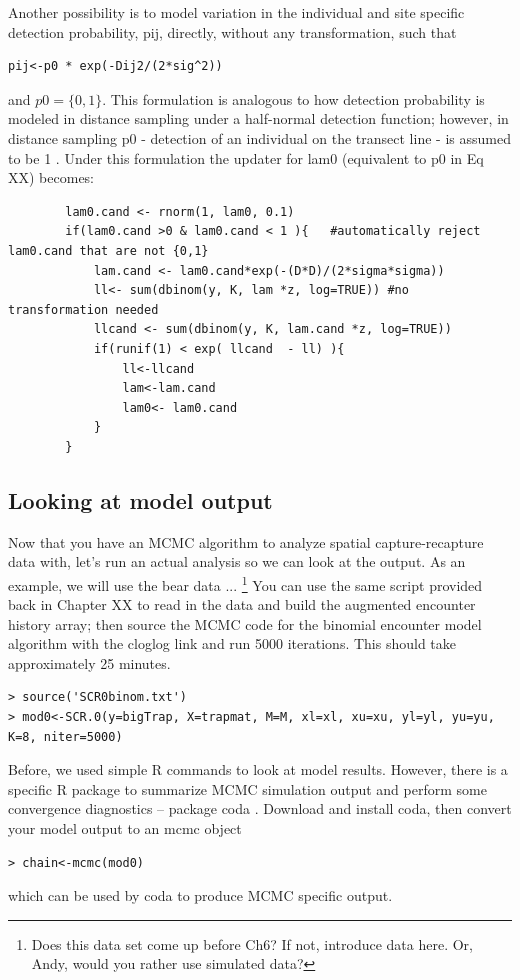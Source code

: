 Another possibility is to model variation in the individual and site specific detection probability, pij, directly, without any transformation, such that
\begin{verbatim}
pij<-p0 * exp(-Dij2/(2*sig^2))
\end{verbatim}
and $p0 = \{0,1\}$. 
This formulation is analogous to how detection probability is modeled in distance sampling under a half-normal detection function; however, in distance sampling p0 - detection of an individual on the transect line - is assumed to be 1 \citep{buckland_etal:2001}. Under this formulation the updater for lam0 (equivalent to p0 in Eq XX) becomes:
\begin{verbatim}
        lam0.cand <- rnorm(1, lam0, 0.1)
        if(lam0.cand >0 & lam0.cand < 1 ){   #automatically reject lam0.cand that are not {0,1}
            lam.cand <- lam0.cand*exp(-(D*D)/(2*sigma*sigma))
            ll<- sum(dbinom(y, K, lam *z, log=TRUE)) #no transformation needed
            llcand <- sum(dbinom(y, K, lam.cand *z, log=TRUE))
            if(runif(1) < exp( llcand  - ll) ){
                ll<-llcand
                lam<-lam.cand
                lam0<- lam0.cand
            }
        } 
\end{verbatim}


\subsection{Looking at model output}
Now that you have an MCMC algorithm to analyze spatial capture-recapture data with, let's run an actual analysis so we can look at the output. As an example, we will use the bear data ... \footnote{Does this data set come up before Ch6? If not, introduce data here. Or, Andy, would you rather use simulated data?} You can use the same script provided back in Chapter XX to read in the data and build the augmented encounter history array; then source the MCMC code for the binomial encounter model algorithm with the cloglog link and run 5000 iterations. This should take approximately 25 minutes. 
\begin{verbatim}
> source('SCR0binom.txt')
> mod0<-SCR.0(y=bigTrap, X=trapmat, M=M, xl=xl, xu=xu, yl=yl, yu=yu, K=8, niter=5000)
\end{verbatim}

Before, we used simple R commands to look at model results. However, there is a specific R package to summarize MCMC simulation output and perform some convergence diagnostics – package coda \citep{plummer_etal:2006}. Download and install coda, then convert your model output to an mcmc object
\begin{verbatim}
> chain<-mcmc(mod0)                  
\end{verbatim} which can be used by coda to produce MCMC specific output.

